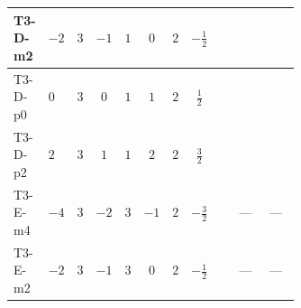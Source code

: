 \documentclass[8pt]{article}
\begin{document}
\begin{landscape}
\begin{longtable}{@{}llcccccc >{\raggedright\arraybackslash}p{0.21\linewidth} >{\raggedright\arraybackslash}p{0.21\linewidth} >{\raggedright\arraybackslash}p{0.21\linewidth}@{}}
\midrule
T3-D-m2 & $-2$ & $3$ & $-1$ & $1$ & $0$ & $2$ & $-\frac{1}{2}$ & \scriptsize\adjustbox{max width=\linewidth}{$\begin{gathered} +4 {\lambda_{12}^{(1)}}^2\end{gathered}$} & \scriptsize\adjustbox{max width=\linewidth}{$\begin{gathered} +8 {\lambda_{12}^{(1)}} {\lambda_{S_1}^{(1)}}\end{gathered}$} & \scriptsize\adjustbox{max width=\linewidth}{$\begin{gathered} +4 {\lambda_{12}^{(1)}} {\lambda_{S_2}^{(1)}}\end{gathered}$} \\
\midrule
T3-D-p0 & $0$ & $3$ & $0$ & $1$ & $1$ & $2$ & $\frac{1}{2}$ & \scriptsize\adjustbox{max width=\linewidth}{$\begin{gathered} +4 {\lambda_{12}^{(1)}}^2\end{gathered}$} & \scriptsize\adjustbox{max width=\linewidth}{$\begin{gathered} +8 {\lambda_{12}^{(1)}} {\lambda_{S_1}^{(1)}}\end{gathered}$} & \scriptsize\adjustbox{max width=\linewidth}{$\begin{gathered} +4 {\lambda_{12}^{(1)}} {\lambda_{S_2}^{(1)}}\end{gathered}$} \\
\midrule
T3-D-p2 & $2$ & $3$ & $1$ & $1$ & $2$ & $2$ & $\frac{3}{2}$ & \scriptsize\adjustbox{max width=\linewidth}{$\begin{gathered} +4 {\lambda_{12}^{(1)}}^2\end{gathered}$} & \scriptsize\adjustbox{max width=\linewidth}{$\begin{gathered} +8 {\lambda_{12}^{(1)}} {\lambda_{S_1}^{(1)}}\end{gathered}$} & \scriptsize\adjustbox{max width=\linewidth}{$\begin{gathered} +4 {\lambda_{12}^{(1)}} {\lambda_{S_2}^{(1)}}\end{gathered}$} \\
\midrule
T3-E-m4 & $-4$ & $3$ & $-2$ & $3$ & $-1$ & $2$ & $-\frac{3}{2}$ & \scriptsize\adjustbox{max width=\linewidth}{$\begin{gathered} +4 {\lambda_{12}^{(1)}}^2\end{gathered}$} & --- & --- \\
\midrule
T3-E-m2 & $-2$ & $3$ & $-1$ & $3$ & $0$ & $2$ & $-\frac{1}{2}$ & \scriptsize\adjustbox{max width=\linewidth}{$\begin{gathered} +4 {\lambda_{12}^{(1)}}^2\end{gathered}$} & --- & --- \\

\end{longtable}
\end{landscape}
\end{document}
